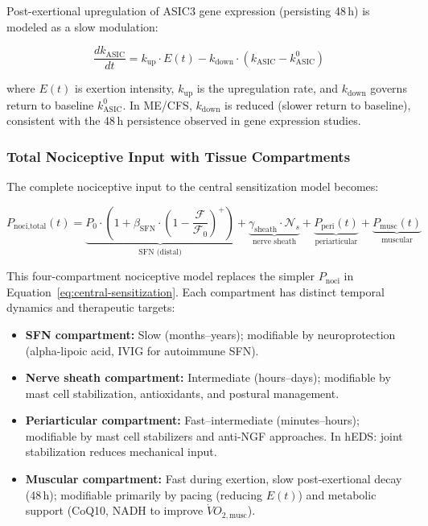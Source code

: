 Post-exertional upregulation of ASIC3 gene expression (persisting 48\,h) is modeled as a slow modulation:

\begin{equation}
\label{eq:asic3-upregulation}
\frac{dk_{\text{ASIC}}}{dt} = k_{\text{up}} \cdot E(t) - k_{\text{down}} \cdot (k_{\text{ASIC}} - k_{\text{ASIC}}^0)
\end{equation}

where $E(t)$ is exertion intensity, $k_{\text{up}}$ is the upregulation rate, and $k_{\text{down}}$ governs return to baseline $k_{\text{ASIC}}^0$. In ME/CFS, $k_{\text{down}}$ is reduced (slower return to baseline), consistent with the 48\,h persistence observed in gene expression studies.

\subsubsection{Total Nociceptive Input with Tissue Compartments}

The complete nociceptive input to the central sensitization model becomes:

\begin{equation}
\label{eq:total-noci-compartments}
P_{\text{noci,total}}(t) = \underbrace{P_0 \cdot \left(1 + \beta_{\text{SFN}} \cdot \left(1 - \frac{\mathcal{F}}{\mathcal{F}_0}\right)^+\right)}_{\text{SFN (distal)}} + \underbrace{\gamma_{\text{sheath}} \cdot \mathcal{N}_s}_{\text{nerve sheath}} + \underbrace{P_{\text{peri}}(t)}_{\text{periarticular}} + \underbrace{P_{\text{musc}}(t)}_{\text{muscular}}
\end{equation}

This four-compartment nociceptive model replaces the simpler $P_{\text{noci}}$ in Equation~\ref{eq:central-sensitization}. Each compartment has distinct temporal dynamics and therapeutic targets:

\begin{itemize}
  \item \textbf{SFN compartment:} Slow (months--years); modifiable by neuroprotection (alpha-lipoic acid, IVIG for autoimmune SFN).
  \item \textbf{Nerve sheath compartment:} Intermediate (hours--days); modifiable by mast cell stabilization, antioxidants, and postural management.
  \item \textbf{Periarticular compartment:} Fast--intermediate (minutes--hours); modifiable by mast cell stabilizers and anti-NGF approaches. In hEDS: joint stabilization reduces mechanical input.
  \item \textbf{Muscular compartment:} Fast during exertion, slow post-exertional decay (48\,h); modifiable primarily by pacing (reducing $E(t)$) and metabolic support (CoQ10, NADH to improve $\dot{V}O_{2,\text{musc}}$).
\end{itemize}

